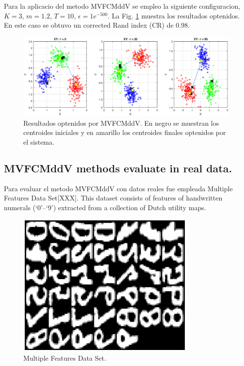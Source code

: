 \documentclass[12pt]{article}
\begin{document}
Para la aplicacio del metodo MVFCMddV se empleo la siguiente configuracion, $K = 3$, $m = 1.2$, $T = 10$, $\epsilon = 1e^{-500}$. La Fig. \ref{fig:cluster_datos_sinteticos} muestra los resultados optenidos. En este caso se obtuvo un corrected Rand index (CR) de $0.98$.


\begin{figure}[h]
\centering
\includegraphics[width=4.5in]{../out/clusters-gauss-3.eps}
\caption{Resultados optenidos por MVFCMddV. En negro se muestran los centroides iniciales y en amarillo los centroides finales optenidos por el sistema.}
\label{fig:cluster_datos_sinteticos}
\end{figure}  


\subsection{MVFCMddV methods evaluate in real data.}

Para evaluar el metodo  MVFCMddV con datos reales fue empleada Multiple Features Data Set[XXX]. This dataset consists of features of handwritten numerals (`0'--`9') extracted from a collection of Dutch utility maps.

\begin{figure}[h]
\centering
\includegraphics[width=3.5in]{../out/data-base.eps}
\caption{Multiple Features Data Set.}
\label{fig:data_base}
\end{figure}  
\end{document}
